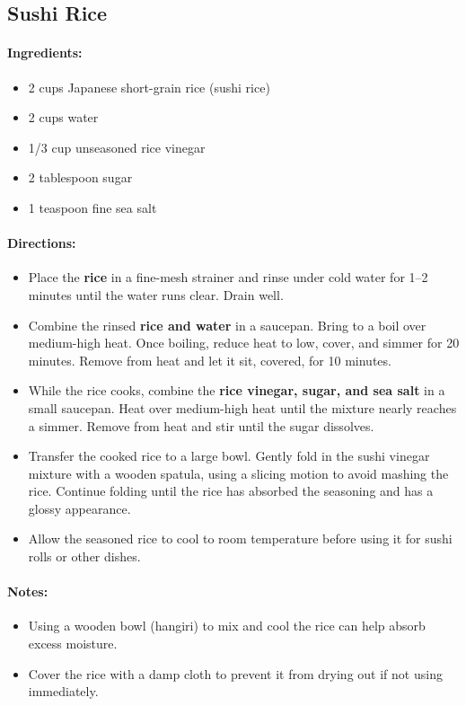 \documentclass{article}
\begin{document}
\subsection{Sushi Rice}

\paragraph{Ingredients:}
\begin{itemize}
    \item 2 cups Japanese short-grain rice (sushi rice)
    \item 2 cups water
    \item 1/3 cup unseasoned rice vinegar
    \item 2 tablespoon sugar
    \item 1 teaspoon fine sea salt
\end{itemize}

\paragraph{Directions:}
\begin{itemize}
    \item Place the \textbf{rice} in a fine-mesh strainer and rinse under cold water for 1–2 minutes until the water runs clear. Drain well.
    \item Combine the rinsed \textbf{rice and water} in a saucepan. Bring to a boil over medium-high heat. Once boiling, reduce heat to low, cover, and simmer for 20 minutes. Remove from heat and let it sit, covered, for 10 minutes.
    \item While the rice cooks, combine the \textbf{rice vinegar, sugar, and sea salt} in a small saucepan. Heat over medium-high heat until the mixture nearly reaches a simmer. Remove from heat and stir until the sugar dissolves.
    \item Transfer the cooked rice to a large bowl. Gently fold in the sushi vinegar mixture with a wooden spatula, using a slicing motion to avoid mashing the rice. Continue folding until the rice has absorbed the seasoning and has a glossy appearance.
    \item Allow the seasoned rice to cool to room temperature before using it for sushi rolls or other dishes.
\end{itemize}

\paragraph{Notes:}
\begin{itemize}
    \item Using a wooden bowl (hangiri) to mix and cool the rice can help absorb excess moisture.
    \item Cover the rice with a damp cloth to prevent it from drying out if not using immediately.
\end{itemize}
\end{document}
